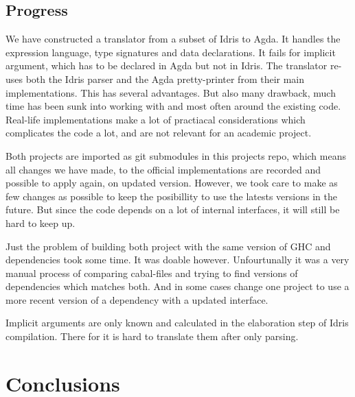 \documentclass[parskip=half]{scrartcl}
\begin{document}
\subsection{Progress}

We have constructed a translator from a subset of Idris to Agda. It handles the
expression language, type signatures and data declarations.  It fails for
implicit argument, which has to be declared in Agda but not in Idris. The
translator re-uses both the Idris parser and the Agda pretty-printer from their
main implementations. This has several advantages. But also many drawback, much
time has been sunk into working with and most often around the existing code.
Real-life implementations make a lot of practiacal considerations which
complicates the code a lot, and are not relevant for an academic project.

Both projects are imported as git submodules in this projects repo, which means
all changes we have made, to the official implementations are recorded and
possible to apply again, on updated version. However, we took care to make as
few changes as possible to keep the posibillity to use the latests versions in
the future. But since the code depends on a lot of internal interfaces, it will
still be hard to keep up.

Just the problem of building both project with the same version of GHC and
dependencies took some time. It was doable however. Unfourtunally it was a very
manual process of comparing cabal-files and trying to find versions of
dependencies which matches both. And in some cases change one project to use
a more recent version of a dependency with a updated interface.

Implicit arguments are only known and calculated in the elaboration step of
Idris compilation. There for it is hard to translate them after only parsing.




\section{Conclusions}




% 

\printbibliography{}
\end{document}
